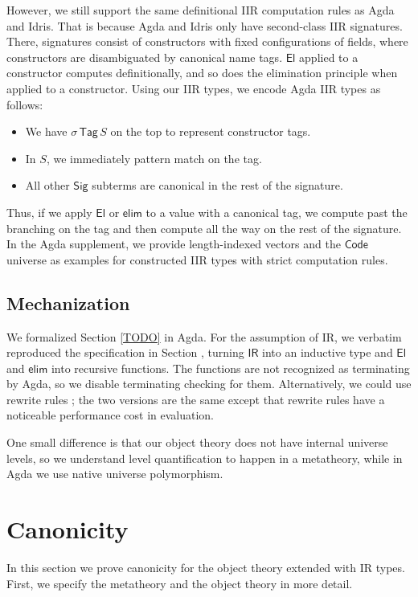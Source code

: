 \documentclass[acmsmall,screen,review,anonymous]{acmart}
\newcommand{\msf}[1]{{\mathsf{#1}}}
\newcommand{\El}{\msf{El}}
\newcommand{\Sig}{\msf{Sig}}
\newcommand{\Code}{\msf{Code}}
\newcommand{\Tag}{\msf{Tag}}
\newcommand{\IR}{\msf{IR}}
\newcommand{\elim}{\msf{elim}}
\begin{document}
However, we still support the same definitional IIR computation rules as Agda and Idris. That is
because Agda and Idris only have second-class IIR signatures. There, signatures consist of
constructors with fixed configurations of fields, where constructors are disambiguated by canonical
name tags. $\El$ applied to a constructor computes definitionally, and so does the elimination
principle when applied to a constructor. Using our IIR types, we encode Agda IIR types as follows:
\begin{itemize}
\item We have $\sigma\,\Tag\,S$ on the top to represent constructor tags.
\item In $S$, we immediately pattern match on the tag.
\item All other $\Sig$ subterms are canonical in the rest of the signature.
\end{itemize}
Thus, if we apply $\El$ or $\elim$ to a value with a canonical tag, we compute past the branching on
the tag and then compute all the way on the rest of the signature. In the Agda supplement, we provide
length-indexed vectors and the $\Code$ universe as examples for constructed IIR types with strict
computation rules.

\subsection{Mechanization}

We formalized Section \ref{TODO} in Agda. For the assumption of IR, we verbatim reproduced the
specification in Section \cite{TODO}, turning $\IR$ into an inductive type and $\El$ and $\elim$
into recursive functions. The functions are not recognized as terminating by Agda, so we disable
terminating checking for them. Alternatively, we could use rewrite rules \cite{TODO}; the two
versions are the same except that rewrite rules have a noticeable performance cost in evaluation.

One small difference is that our object theory does not have internal universe levels, so we
understand level quantification to happen in a metatheory, while in Agda we use native universe
polymorphism.

\section{Canonicity}\label{sec:canonicity}

In this section we prove canonicity for the object theory extended with IR types. First, we specify
the metatheory and the object theory in more detail.
\end{document}

